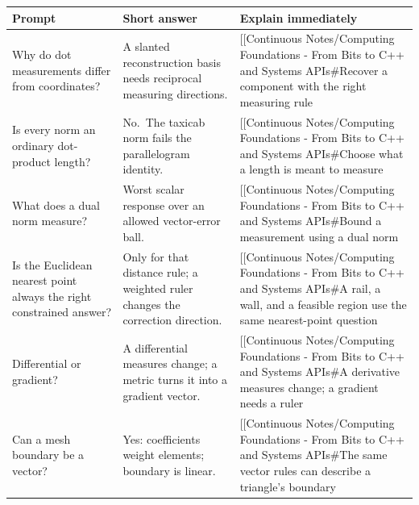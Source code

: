 {\def\LTcaptype{none} %
\begin{longtable}[]{@{}
  >{\raggedright\arraybackslash}p{}
  >{\raggedright\arraybackslash}p{}
  >{\raggedright\arraybackslash}p{}@{}}
\toprule\noalign{}
\begin{minipage}[b]{\linewidth}\raggedright
Prompt
\end{minipage} & \begin{minipage}[b]{\linewidth}\raggedright
Short answer
\end{minipage} & \begin{minipage}[b]{\linewidth}\raggedright
Explain immediately
\end{minipage} \\
\midrule\noalign{}
\endhead
\bottomrule\noalign{}
\endlastfoot
Why do dot measurements differ from coordinates? & A slanted reconstruction basis needs reciprocal measuring directions. & {[}{[}Continuous Notes/Computing Foundations - From Bits to C++ and Systems APIs\#Recover a component with the right measuring rule \\
Is every norm an ordinary dot-product length? & No.~The taxicab norm fails the parallelogram identity. & {[}{[}Continuous Notes/Computing Foundations - From Bits to C++ and Systems APIs\#Choose what a length is meant to measure \\
What does a dual norm measure? & Worst scalar response over an allowed vector-error ball. & {[}{[}Continuous Notes/Computing Foundations - From Bits to C++ and Systems APIs\#Bound a measurement using a dual norm \\
Is the Euclidean nearest point always the right constrained answer? & Only for that distance rule; a weighted ruler changes the correction direction. & {[}{[}Continuous Notes/Computing Foundations - From Bits to C++ and Systems APIs\#A rail, a wall, and a feasible region use the same nearest-point question \\
Differential or gradient? & A differential measures change; a metric turns it into a gradient vector. & {[}{[}Continuous Notes/Computing Foundations - From Bits to C++ and Systems APIs\#A derivative measures change; a gradient needs a ruler \\
Can a mesh boundary be a vector? & Yes: coefficients weight elements; boundary is linear. & {[}{[}Continuous Notes/Computing Foundations - From Bits to C++ and Systems APIs\#The same vector rules can describe a triangle's boundary \\

\end{longtable}}
